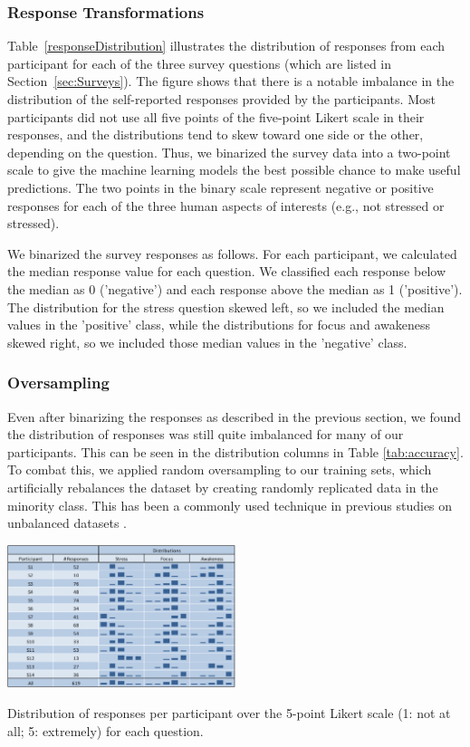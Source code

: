 \subsubsection{Response Transformations}
Table~\ref{responseDistribution} illustrates the distribution of responses from each participant for each of the three survey questions (which are listed in Section~\ref{sec:Surveys}). The figure shows that there is a notable imbalance in the distribution of the self-reported responses provided by the participants. Most participants did not use all five points of the five-point Likert scale in their responses, and the distributions tend to skew toward one side or the other, depending on the question. Thus, we binarized the survey data into a two-point scale to give the machine learning models the best possible chance to make useful predictions. The two points in the binary scale represent negative or positive responses for each of the three human aspects of interests (e.g., not stressed or stressed). 

We binarized the survey responses as follows. For each participant, we calculated the median response value for each question. We classified each response below the median as 0 ('negative') and each response above the median as 1 ('positive'). The distribution for the stress question skewed left, so we included the median values in the 'positive' class, while the distributions for focus and awakeness skewed right, so we included those median values in the 'negative' class.

\subsubsection{Oversampling}
Even after binarizing the responses as described in the previous section, we found the distribution of responses was still quite imbalanced for many of our participants. This can be seen in the distribution columns in Table \ref{tab:accuracy}. To combat this, we applied random oversampling to our training sets, which artificially rebalances the dataset by creating randomly replicated data in the minority class. This has been a commonly used technique in previous studies on unbalanced datasets \cite{chawla2004,yap2014}.


\begin{table}
  \centering
      \includegraphics[width=0.5\textwidth]{distributiontable.pdf}
  \caption{Distribution of responses per participant over the 5-point Likert scale (1: not at all; 5: extremely) for each question. }
   \label{responseDistribution}
   \vspace*{-6mm}
\end{table}

